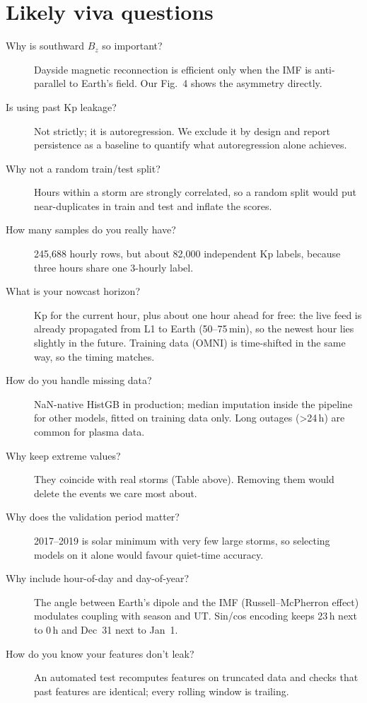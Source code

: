\documentclass[11pt,a4paper]{article}
\begin{document}
\section{Likely viva questions}
\begin{description}
\item[Why is southward $B_z$ so important?] Dayside magnetic reconnection is efficient only when the IMF is
anti-parallel to Earth's field. Our Fig.~4 shows the asymmetry directly.
\item[Is using past Kp leakage?] Not strictly; it is autoregression. We exclude it by design and report
persistence as a baseline to quantify what autoregression alone achieves.
\item[Why not a random train/test split?] Hours within a storm are strongly correlated, so a random split
would put near-duplicates in train and test and inflate the scores.
\item[How many samples do you really have?] 245{,}688 hourly rows, but about 82{,}000 independent Kp labels,
because three hours share one 3-hourly label.
\item[What is your nowcast horizon?] Kp for the current hour, plus about one hour ahead for free: the live feed
is already propagated from L1 to Earth (50--75\,min), so the newest hour lies slightly in the future. Training
data (OMNI) is time-shifted in the same way, so the timing matches.
\item[How do you handle missing data?] NaN-native HistGB in production; median imputation inside the pipeline
for other models, fitted on training data only. Long outages (>24\,h) are common for plasma data.
\item[Why keep extreme values?] They coincide with real storms (Table above). Removing them would delete the
events we care most about.
\item[Why does the validation period matter?] 2017--2019 is solar minimum with very few large storms, so
selecting models on it alone would favour quiet-time accuracy.
\item[Why include hour-of-day and day-of-year?] The angle between Earth's dipole and the IMF (Russell--McPherron
effect) modulates coupling with season and UT. Sin/cos encoding keeps 23\,h next to 0\,h and Dec~31 next to Jan~1.
\item[How do you know your features don't leak?] An automated test recomputes features on truncated data and
checks that past features are identical; every rolling window is trailing.

\end{description}
\end{document}

